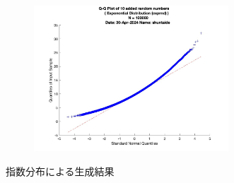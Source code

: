 \begin{figure}
\begin{subfigure}{0.48\linewidth}
		\label{fig:cl-exp-added}
	\end{subfigure}
	\begin{subfigure}{0.48\linewidth}
		\centering
		\includegraphics[width=0.8\textwidth]{src/figures/cl-exp/cl_added_exprnd_qqpl_N=100000.jpg}
		\label{fig:cl-exp-added-qqpl}
	\end{subfigure}
	\caption{指数分布による生成結果}\label{fig:cl-exp-random}
\end{figure}
